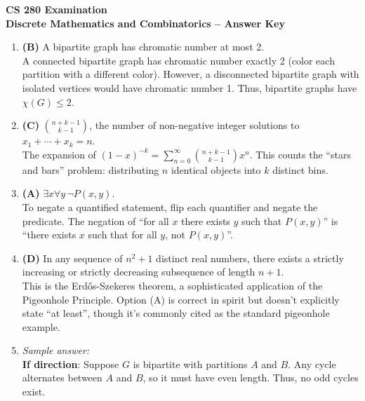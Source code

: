 \documentclass[11pt]{article}
\begin{document}
\begin{center}
  {\Large \textbf{CS 280 Examination}}\\[0.25em]
  {\large \textbf{Discrete Mathematics and Combinatorics -- Answer Key}}\\[0.5em]
\end{center}

\begin{enumerate}[label=\textbf{\arabic*.}]

  \item \textbf{(B)} A bipartite graph has chromatic number at most 2.\\
  A connected bipartite graph has chromatic number exactly 2 (color each partition with a different 
  color). However, a disconnected bipartite graph with isolated vertices would have chromatic number 1. 
  Thus, bipartite graphs have $\chi(G) \leq 2$.

  \item \textbf{(C)} $\binom{n+k-1}{k-1}$, the number of non-negative integer solutions to 
  $x_1 + \cdots + x_k = n$.\\
  The expansion of $(1-x)^{-k} = \sum_{n=0}^{\infty} \binom{n+k-1}{k-1} x^n$. This counts the 
  ``stars and bars'' problem: distributing $n$ identical objects into $k$ distinct bins.

  \item \textbf{(A)} $\exists x \forall y \, \neg P(x, y)$.\\
  To negate a quantified statement, flip each quantifier and negate the predicate. The negation 
  of ``for all $x$ there exists $y$ such that $P(x,y)$'' is ``there exists $x$ such that for all 
  $y$, not $P(x,y)$''.

  \item \textbf{(D)} In any sequence of $n^2 + 1$ distinct real numbers, there exists a strictly 
  increasing or strictly decreasing subsequence of length $n+1$.\\
  This is the Erd\H{o}s-Szekeres theorem, a sophisticated application of the Pigeonhole Principle. 
  Option (A) is correct in spirit but doesn't explicitly state ``at least'', though it's commonly 
  cited as the standard pigeonhole example.

  \item \emph{Sample answer:}\\
  \textbf{If direction}: Suppose $G$ is bipartite with partitions $A$ and $B$. Any cycle alternates 
  between $A$ and $B$, so it must have even length. Thus, no odd cycles exist.


\end{enumerate}
\end{document}
